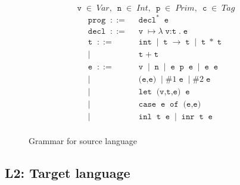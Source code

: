 \documentclass[preprint,10pt,nocopyrightspace,nonatbib]{./bibs/sigplanconf}
\newcommand{\gramdef}{\; ::= \;}
\newcommand{\gramor}{\; | \;}
\newcommand{\keywd}[1]{\; \texttt{#1} \;}
\newcommand{\keywdr}[1]{\; \texttt{#1}^{*} \;}
\begin{document}
\begin{figure}
  \begin{displaymath}
    \keywd{v} \in \; Var, \:
    \keywd{n} \in \; Int, \: \keywd{p} \in \; Prim, \: \keywd{c} \in \; Tag
  \end{displaymath}
  \begin{displaymath}
    \begin{aligned}
      \keywd{prog} \gramdef & \keywdr{decl} \keywd{e} \\
      \keywd{decl} \gramdef & \keywd{v} \mapsto \lambda \keywd{v:t}. \keywd{e} \\
      \keywd{t} \gramdef & \keywd{int} \gramor \keywd{t} \rightarrow \keywd{t} \gramor \keywd{t} * \keywd{t}  \\
      \gramor & \keywd{t} + \keywd{t} \\
      \keywd{e} \gramdef & \keywd{v} \gramor \keywd{n} \gramor \keywd{e} \keywd{p} \keywd{e} \gramor \keywd{e} \keywd{e} \\
      \gramor & \keywd{(e,e)} \gramor \# 1 \keywd{e} \gramor \# 2 \keywd{e} \\
      \gramor & \keywd{let} \keywd{(v,t,e)} \keywd{e} \\
      \gramor & \keywd{case} \keywd{e} \keywd{of} \keywd{(e,e)} \\
      \gramor & \keywd{inl} \keywd{t} \keywd{e} \gramor \keywd{inr} \keywd{t} \keywd{e} \\
    \end{aligned}
  \end{displaymath}
  \caption{Grammar for source language}
\end{figure}

\subsection{L2: Target language}
\end{document}
